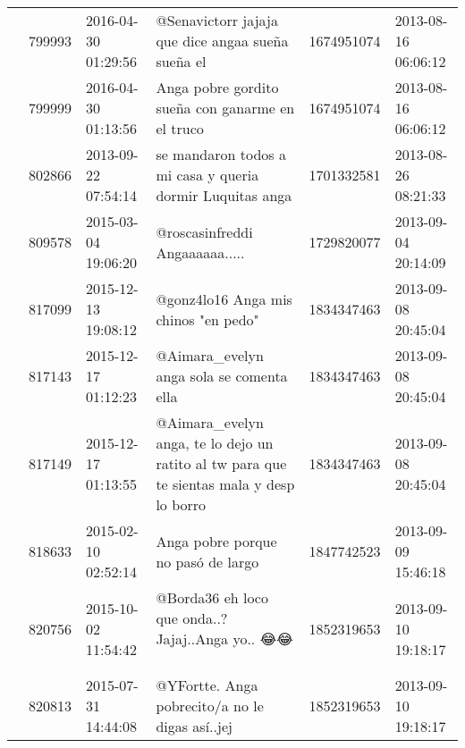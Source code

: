 \begin{tabular}{llllrl}
           & 799993  & 2016-04-30 01:29:56 &                                                                                            @Senavictorr jajaja que dice angaa sueña sueña el &  1674951074 & 2013-08-16 06:06:12 \\
           & 799999  & 2016-04-30 01:13:56 &                                                                                             Anga pobre gordito sueña con ganarme en el truco &  1674951074 & 2013-08-16 06:06:12 \\
           & 802866  & 2013-09-22 07:54:14 &                                                                                    se mandaron todos a mi casa y queria dormir Luquitas anga &  1701332581 & 2013-08-26 08:21:33 \\
           & 809578  & 2015-03-04 19:06:20 &                                                                                                               @roscasinfreddi Angaaaaaa..... &  1729820077 & 2013-09-04 20:14:09 \\
           & 817099  & 2015-12-13 19:08:12 &                                                                                                         @gonz4lo16 Anga mis chinos "en pedo" &  1834347463 & 2013-09-08 20:45:04 \\
           & 817143  & 2015-12-17 01:12:23 &                                                                                                     @Aimara\_evelyn anga sola se comenta ella &  1834347463 & 2013-09-08 20:45:04 \\
           & 817149  & 2015-12-17 01:13:55 &                                                     @Aimara\_evelyn anga, te lo dejo un ratito al tw para que te sientas mala y desp lo borro &  1834347463 & 2013-09-08 20:45:04 \\
           & 818633  & 2015-02-10 02:52:14 &                                                                                                           Anga pobre porque no pasó de largo &  1847742523 & 2013-09-09 15:46:18 \\
           & 820756  & 2015-10-02 11:54:42 &                                                                                             @Borda36 eh loco que onda..?Jajaj..Anga yo.. 😂😂🙈 &  1852319653 & 2013-09-10 19:18:17 \\
           & 820813  & 2015-07-31 14:44:08 &                                                                                              @YFortte. Anga pobrecito/a no le digas así..jej &  1852319653 & 2013-09-10 19:18:17 \\

\end{tabular}
